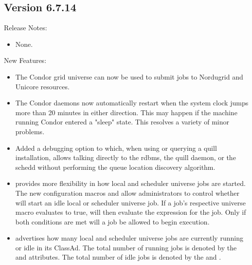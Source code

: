 \subsection*{\label{sec:New-6-7.14}Version 6.7.14}

\noindent Release Notes:

\begin{itemize}

\item None.

\end{itemize}

\noindent New Features:

\begin{itemize}

\item The Condor grid universe can now be used to submit jobs to
Nordugrid and Unicore resources.

\item The Condor daemons now automatically restart when the
system clock jumps more than 20 minutes in either
direction.  This may happen if the machine running Condor entered
a "sleep" state.  This resolves a variety of minor problems.

\item Added a  debugging option to  which, when
using or querying a quill installation, allows talking directly to the
rdbms, the quill daemon, or the schedd without performing the queue
location discovery algorithm.

\item {} provides more flexibility in how local and
scheduler universe jobs are started. The new configuration macros
 and 
allow administrators to control whether  will start
an idle local or scheduler universe job. If a job's respective universe
macro evaluates to true,  will then evaluate the 
 expression for the job. Only if both conditions are
met will a job be allowed to begin execution.

\item {} advertises how many local and scheduler
universe jobs are currently running or idle in its ClassAd. The
total number of running jobs is denoted by the
 and 
attributes. The total number of idle jobs is denoted by the
 and .


\end{itemize}
